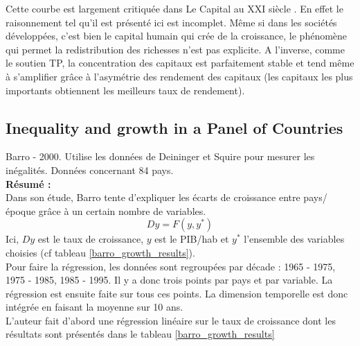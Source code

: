 \documentclass[11pt,a4paper]{article}
\begin{document}
Cette courbe est largement critiquée dans \og Le Capital au XXI siècle \fg. En effet le raisonnement tel qu'il est présenté ici est incomplet. Même si dans les sociétés développées, c'est bien le capital humain qui crée de la croissance, le phénomène qui permet la redistribution des richesses n'est pas explicite. A l'inverse, comme le soutien TP, la concentration des capitaux est parfaitement stable et tend même à s'amplifier grâce à l'asymétrie des rendement des capitaux (les capitaux les plus importants obtiennent les meilleurs taux de rendement). 

\subsection{Inequality and growth in a Panel of Countries}
Barro - 2000. Utilise les données de Deininger et Squire pour mesurer les inégalités. Données concernant 84 pays. \\

\noindent
\textbf{Résumé :}\\
Dans son étude, Barro tente d'expliquer les écarts de croissance entre pays/époque grâce à un certain nombre de variables. 
\begin{equation}
Dy = F(y, y^*)
\end{equation}
Ici, $Dy$ est le taux de croissance, $y$ est le PIB/hab et $y^*$ l'ensemble des variables choisies (cf tableau \ref{barro_growth_results}). \\

Pour faire la régression, les données sont regroupées par décade : 1965 - 1975,  1975 - 1985, 1985 - 1995. Il y a donc trois points par pays et par variable. La régression est ensuite faite sur tous ces points. La dimension temporelle est donc intégrée en faisant la moyenne sur 10 ans. \\
L'auteur fait d'abord une régression linéaire sur le taux de croissance dont les résultats sont présentés dans le tableau \ref{barro_growth_results}
\end{document}
